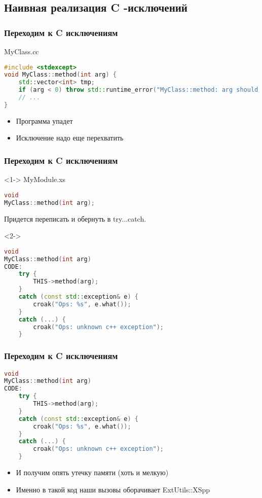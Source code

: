 \documentclass[pdflatex,hyperref={unicode=true}]{beamer}
\DeclareRobustCommand{\cpp}{
    \texorpdfstring{\hbox{C\hspace{-0.5ex}\protect\raisebox{0.5ex}{\protect\scalebox{0.67}{++}}}}{C++}
}
\begin{document}
\subsection{Наивная реализация \cpp-исключений}
\begin{frame}[fragile]
    \frametitle{Переходим к \cpp исключениям}
    MyClass.cc
    \begin{lstlisting}[language=C++,style=PerlXS]
#include <stdexcept>
void MyClass::method(int arg) {
    std::vector<int> tmp;
    if (arg < 0) throw std::runtime_error("MyClass::method: arg should be positive");
    // ...
}
    \end{lstlisting}
    \begin{itemize}
        \item Программа упадет
        \item Исключение надо еще перехватить
    \end{itemize}
\end{frame}

\begin{frame}[fragile]
    \frametitle{Переходим к \cpp исключениям}
    \begin{onlyenv}<1->
        MyModule.xs
        \begin{lstlisting}[language=C++,style=PerlXS]
void
MyClass::method(int arg);
        \end{lstlisting}
        Придется переписать и обернуть в try...catch.
    \end{onlyenv}
    \begin{onlyenv}<2->
        \begin{lstlisting}[language=C++,style=PerlXS]
void
MyClass::method(int arg)
CODE:
    try {
        THIS->method(arg);
    }
    catch (const std::exception& e) {
        croak("Ops: %s", e.what());
    }
    catch (...) {
        croak("Ops: unknown c++ exception");
    }
        \end{lstlisting}
    \end{onlyenv}
\end{frame}

\begin{frame}[fragile]
    \frametitle{Переходим к \cpp исключениям}
    \begin{lstlisting}[language=C++,style=PerlXS]
void
MyClass::method(int arg)
CODE:
    try {
        THIS->method(arg);
    }
    catch (const std::exception& e) {
        croak("Ops: %s", e.what());
    }
    catch (...) {
        croak("Ops: unknown c++ exception");
    }
    \end{lstlisting}
    \begin{itemize}
        \item<2-| alert@2-> И получим опять утечку памяти (хоть и мелкую)
        \item<3-> Именно в такой код наши вызовы оборачивает ExtUtils::XSpp
    \end{itemize}
\end{frame}
\end{document}
